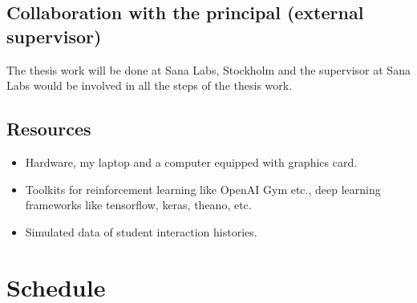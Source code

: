 \documentclass[12pt]{article}
\begin{document}
\subsection{Collaboration with the principal (external supervisor)}
The thesis work will be done at Sana Labs, Stockholm and the supervisor at Sana Labs would be involved in all the steps of the thesis work.

\subsection{Resources}
\begin{itemize}
\item Hardware, my laptop and a computer equipped with graphics card.
\item Toolkits for reinforcement learning like OpenAI Gym etc., deep learning frameworks like tensorflow, keras, theano, etc.
\item Simulated data of student interaction histories.
\end{itemize}

\newpage
\section*{Schedule}

\end{document}
